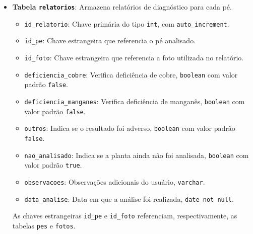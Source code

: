 \begin{itemize}
    \item \textbf{Tabela \texttt{relatorios}}: Armazena relatórios de diagnóstico para cada pé.
    \begin{itemize}
        \item \texttt{id\_relatorio}: Chave primária do tipo \texttt{int}, com \texttt{auto\_increment}.
        \item \texttt{id\_pe}: Chave estrangeira que referencia o pé analisado.
        \item \texttt{id\_foto}: Chave estrangeira que referencia a foto utilizada no relatório.
        \item \texttt{deficiencia\_cobre}: Verifica deficiência de cobre, \texttt{boolean} com valor padrão \texttt{false}.
        \item \texttt{deficiencia\_manganes}: Verifica deficiência de manganês, \texttt{boolean} com valor padrão \texttt{false}.
        \item \texttt{outros}: Indica se o resultado foi adverso, \texttt{boolean} com valor padrão \texttt{false}.
        \item \texttt{nao\_analisado}: Indica se a planta ainda não foi analisada, \texttt{boolean} com valor padrão \texttt{true}.
        \item \texttt{observacoes}: Observações adicionais do usuário, \texttt{varchar}.
        \item \texttt{data\_analise}: Data em que a análise foi realizada, \texttt{date not null}.
    \end{itemize}
    As chaves estrangeiras \texttt{id\_pe} e \texttt{id\_foto} referenciam, respectivamente, as tabelas \texttt{pes} e \texttt{fotos}.
\end{itemize}
